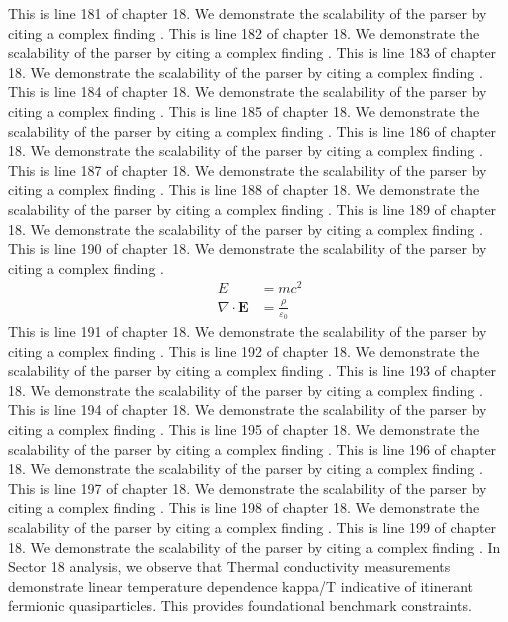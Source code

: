 This is line 181 of chapter 18. We demonstrate the scalability of the parser by citing a complex finding \cite{ref18_181}.
This is line 182 of chapter 18. We demonstrate the scalability of the parser by citing a complex finding \cite{ref18_182}.
This is line 183 of chapter 18. We demonstrate the scalability of the parser by citing a complex finding \cite{ref18_183}.
This is line 184 of chapter 18. We demonstrate the scalability of the parser by citing a complex finding \cite{ref18_184}.
This is line 185 of chapter 18. We demonstrate the scalability of the parser by citing a complex finding \cite{ref18_185}.
This is line 186 of chapter 18. We demonstrate the scalability of the parser by citing a complex finding \cite{ref18_186}.
This is line 187 of chapter 18. We demonstrate the scalability of the parser by citing a complex finding \cite{ref18_187}.
This is line 188 of chapter 18. We demonstrate the scalability of the parser by citing a complex finding \cite{ref18_188}.
This is line 189 of chapter 18. We demonstrate the scalability of the parser by citing a complex finding \cite{ref18_189}.
This is line 190 of chapter 18. We demonstrate the scalability of the parser by citing a complex finding \cite{ref18_190}.
\begin{align*}
  E &= mc^2 \\
  \nabla \cdot \mathbf{E} &= \frac{\rho}{\varepsilon_0}
\end{align*}
This is line 191 of chapter 18. We demonstrate the scalability of the parser by citing a complex finding \cite{ref18_191}.
This is line 192 of chapter 18. We demonstrate the scalability of the parser by citing a complex finding \cite{ref18_192}.
This is line 193 of chapter 18. We demonstrate the scalability of the parser by citing a complex finding \cite{ref18_193}.
This is line 194 of chapter 18. We demonstrate the scalability of the parser by citing a complex finding \cite{ref18_194}.
This is line 195 of chapter 18. We demonstrate the scalability of the parser by citing a complex finding \cite{ref18_195}.
This is line 196 of chapter 18. We demonstrate the scalability of the parser by citing a complex finding \cite{ref18_196}.
This is line 197 of chapter 18. We demonstrate the scalability of the parser by citing a complex finding \cite{ref18_197}.
This is line 198 of chapter 18. We demonstrate the scalability of the parser by citing a complex finding \cite{ref18_198}.
This is line 199 of chapter 18. We demonstrate the scalability of the parser by citing a complex finding \cite{ref18_199}.
In Sector 18 analysis, we observe that Thermal conductivity measurements demonstrate linear temperature dependence kappa/T indicative of itinerant fermionic quasiparticles. This provides foundational benchmark constraints.
